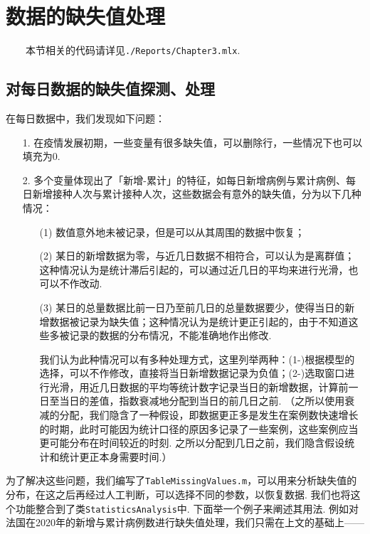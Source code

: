 \documentclass[a4paper, titlepage]{article}
\begin{document}
    \newpage
    \section{数据的缺失值处理}\label{数据的缺失值处理}
    　　本节相关的代码请详见\texttt{./Reports/Chapter3.mlx}.
        \subsection{对每日数据的缺失值探测、处理}
        在每日数据中，我们发现如下问题：
        \begin{enumerate}
            \item [1.] 在疫情发展初期，一些变量有很多缺失值，可以删除行，一些情况下也可以填充为$0$.
            \item [2.] 多个变量体现出了「新增-累计」的特征，如每日新增病例与累计病例、每日新增接种人次与累计接种人次，这些数据会有意外的缺失值，分为以下几种情况：
                \begin{enumerate}
                    \item [(1)] 数值意外地未被记录，但是可以从其周围的数据中恢复；
                    \item [(2)] 某日的新增数据为零，与近几日数据不相符合，可以认为是离群值；这种情况认为是统计滞后引起的，可以通过近几日的平均来进行光滑，也可以不作改动.
                    \item [(3)] 某日的总量数据比前一日乃至前几日的总量数据要少，使得当日的新增数据被记录为缺失值；这种情况认为是统计更正引起的，由于不知道这些多被记录的数据的分布情况，不能准确地作出修改.
                    
                    {\kaishu 我们认为此种情况可以有多种处理方式，这里列举两种：(1-)根据模型的选择，可以不作修改，直接将当日新增数据记录为负值；(2-)选取窗口进行光滑，用近几日数据的平均等统计数字记录当日的新增数据，计算前一日至当日的差值，指数衰减地分配到当日的前几日之前. （之所以使用衰减的分配，我们隐含了一种假设，即数据更正多是发生在案例数快速增长的时期，此时可能因为统计口径的原因多记录了一些案例，这些案例应当更可能分布在时间较近的时刻. 之所以分配到几日之前，我们隐含假设统计和统计更正本身需要时间.）}
                \end{enumerate}
        \end{enumerate}
        为了解决这些问题，我们编写了\texttt{TableMissingValues.m}，可以用来分析缺失值的分布，在这之后再经过人工判断，可以选择不同的参数，以恢复数据. 我们也将这个功能整合到了类\texttt{StatisticsAnalysis}中. 下面举一个例子来阐述其用法. 例如对法国在2020年的新增与累计病例数进行缺失值处理，我们只需在上文的基础上——
\end{document}

